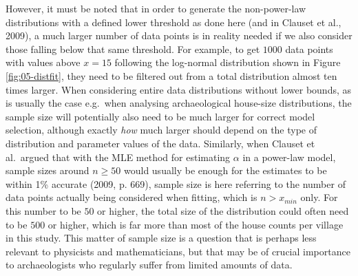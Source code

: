 \documentclass[
  12pt,
]{book}
\begin{document}
However, it must be noted that in order to generate the non-power-law distributions with a defined lower threshold as done here (and in Clauset et al., 2009), a much larger number of data points is in reality needed if we also consider those falling below that same threshold. For example, to get \(1000\) data points with values above \(x = 15\) following the log-normal distribution shown in Figure \ref{fig:05-distfit}, they need to be filtered out from a total distribution almost ten times larger. When considering entire data distributions without lower bounds, as is usually the case e.g.~when analysing archaeological house-size distributions, the sample size will potentially also need to be much larger for correct model selection, although exactly \emph{how} much larger should depend on the type of distribution and parameter values of the data. Similarly, when Clauset et al.~argued that with the MLE method for estimating \(\alpha\) in a power-law model, sample sizes around \(n \geq 50\) would usually be enough for the estimates to be within 1\% accurate (2009, p. 669), sample size is here referring to the number of data points actually being considered when fitting, which is \(n > x_{min}\) only. For this number to be \(50\) or higher, the total size of the distribution could often need to be \(500\) or higher, which is far more than most of the house counts per village in this study. This matter of sample size is a question that is perhaps less relevant to physicists and mathematicians, but that may be of crucial importance to archaeologists who regularly suffer from limited amounts of data.
\end{document}

